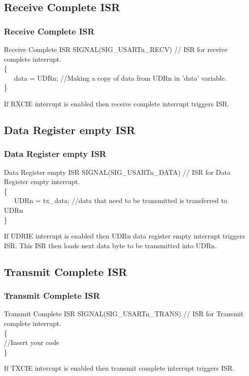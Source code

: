 \documentclass[table,10pt,red]{beamer}	%
\begin{document}
\subsection{Receive Complete ISR}
\begin{frame}
	\frametitle{Receive Complete ISR}	
	\begin{block}{Receive Complete ISR}
		SIGNAL(SIG\_USARTn\_RECV)\color{red}  // ISR for receive complete interrupt.\color{black}\\
		\{ \\
		\ \ \ 	data = UDRn; \color{red}      //Making a copy of data from UDRn in 'data' variable.\color{black} \\
		\}
	\end{block}
		If RXCIE interrupt is enabled then receive complete interrupt triggers ISR.
\end{frame}


	\subsection{Data Register empty ISR}	
	\begin{frame}	
	\frametitle{Data Register empty ISR}
	\begin{block}{Data Register empty ISR}
		SIGNAL(SIG\_USARTn\_DATA) \color{red} // ISR for Data Register empty interrupt.\color{black}\\
		\{ \\
		\ \ \ 	UDRn = tx\_data; \color{red}      //data that need to be transmitted is transferred to\\ \hspace{50mm} UDRn\color{black}\\
		\}
	\end{block}
		If UDRIE interrupt is enabled then UDRn data register empty interrupt triggers ISR. This ISR then loads next data byte to be transmitted into UDRn.

	\end{frame}


	\subsection{Transmit Complete ISR}
	\begin{frame}
	\frametitle{Transmit Complete ISR}	
	\begin{block}{Transmit Complete ISR}
		SIGNAL(SIG\_USARTn\_TRANS)\color{red}  // ISR for Transmit complete interrupt.\color{black}\\
		\{ \\
			\color{red}	//Insert your code\color{black}\\
		\}
	\end{block}
		If TXCIE interrupt is enabled then transmit complete interrupt triggers ISR.
	\end{frame}
	
\end{document}
